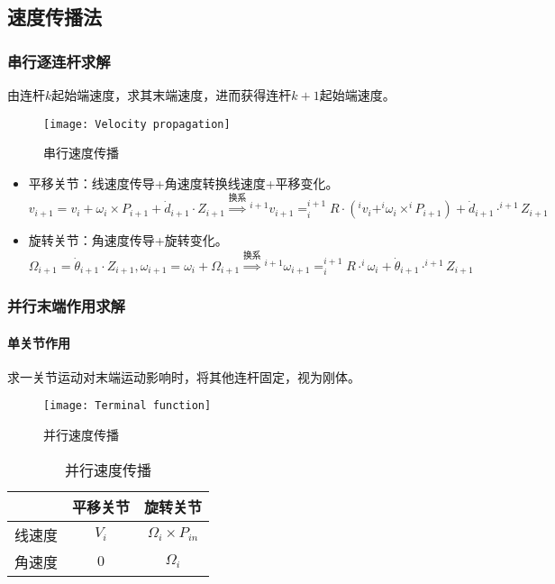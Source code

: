 \documentclass[
12pt, %
a4paper, 
oneside, %
headinclude,footinclude, %
]{scrartcl}
\begin{document}
\subsection[速度传播法]{速度传播法}
\subsubsection[串行逐连杆求解]{串行逐连杆求解}
由连杆$ k $起始端速度，求其末端速度，进而获得连杆$ k + 1 $起始端速度。

\begin{figure}[H]
\centering 
\texttt{[image: Velocity propagation]} 
\caption[串行速度传播]{串行速度传播}
\end{figure}

\begin{itemize}
\item 平移关节：线速度传导+角速度转换线速度+平移变化。
$$
v_{i + 1} = v_i + \omega_i \times P_{i + 1} + \dot{d}_{i + 1} \cdot Z_{i + 1}
\overset{\text{换系}}{\Longrightarrow}
{}^{i + 1}v_{i + 1} = ^{i + 1}_i R \cdot (^i v_i + ^i\omega_i \times ^i P_{i + 1}) + \dot{d}_{i + 1} \cdot ^{i + 1}Z_{i + 1}
$$
\item 旋转关节：角速度传导+旋转变化。
$$
\Omega_{i + 1} = \dot{\theta}_{i + 1} \cdot Z_{i + 1}, \omega_{i + 1} = \omega_i + \Omega_{i + 1}
\overset{\text{换系}}{\Longrightarrow}
{}^{i + 1}\omega_{i + 1} = ^{i + 1}_i R \cdot ^i\omega_i + \dot{\theta}_{i + 1} \cdot ^{i + 1}Z_{i + 1}
$$
\end{itemize} 
\subsubsection[并行末端作用求解]{并行末端作用求解}
\paragraph{单关节作用}\label{sec:bingxing}
求一关节运动对末端运动影响时，将其他连杆固定，视为刚体。

\begin{figure}[H]
\centering 
\texttt{[image: Terminal function]} 
\caption[并行速度传播]{并行速度传播}
\end{figure}

\begin{table}[H]
\centering
\begin{tabular}{c|cc}
\hline
& 平移关节 & 旋转关节 \\
\hline
线速度 & $ V_i $ & $ \Omega_i \times P_{in} $ \\
角速度 & $ 0 $ & $ \Omega_i $ \\
\hline
\end{tabular}
\caption{并行速度传播}
\end{table}
\end{document}
